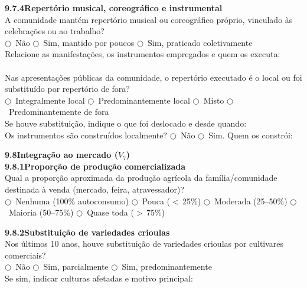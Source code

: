 \medskip\noindent\textbf{9.7.4\quad Repertório musical, coreográfico e instrumental}\\[2pt]
A comunidade mantém repertório musical ou coreográfico próprio, vinculado às celebrações ou ao trabalho?\\
$\bigcirc$~Não \quad $\bigcirc$~Sim, mantido por poucos \quad $\bigcirc$~Sim, praticado coletivamente\\[2pt]
Relacione as manifestações, os instrumentos empregados e quem os executa: \dotfill\\[2pt]\dotfill\\[2pt]
Nas apresentações públicas da comunidade, o repertório executado é o local ou foi substituído por repertório de fora?\\
$\bigcirc$~Integralmente local \quad $\bigcirc$~Predominantemente local \quad $\bigcirc$~Misto \quad $\bigcirc$~Predominantemente de fora\\[2pt]
Se houve substituição, indique o que foi deslocado e desde quando: \dotfill\\[2pt]
Os instrumentos são construídos localmente? \quad $\bigcirc$~Não \quad $\bigcirc$~Sim. Quem os constrói: \dotfill

\bigskip\noindent\textbf{9.8\quad Integração ao mercado ($V_7$)}\\[6pt]

\noindent\textbf{9.8.1\quad Proporção de produção comercializada}\\[2pt]
Qual a proporção aproximada da produção agrícola da família/comunidade destinada à venda (mercado, feira, atravessador)?\\
$\bigcirc$~Nenhuma (100\% autoconsumo) \quad $\bigcirc$~Pouca ($<$\,25\%) \quad $\bigcirc$~Moderada (25--50\%) \quad $\bigcirc$~Maioria (50--75\%) \quad $\bigcirc$~Quase toda ($>$\,75\%)

\medskip\noindent\textbf{9.8.2\quad Substituição de variedades crioulas}\\[2pt]
Nos últimos 10 anos, houve substituição de variedades crioulas por cultivares comerciais?\\
$\bigcirc$~Não \quad $\bigcirc$~Sim, parcialmente \quad $\bigcirc$~Sim, predominantemente\\[2pt]
Se sim, indicar culturas afetadas e motivo principal: \dotfill\\[2pt]\dotfill

